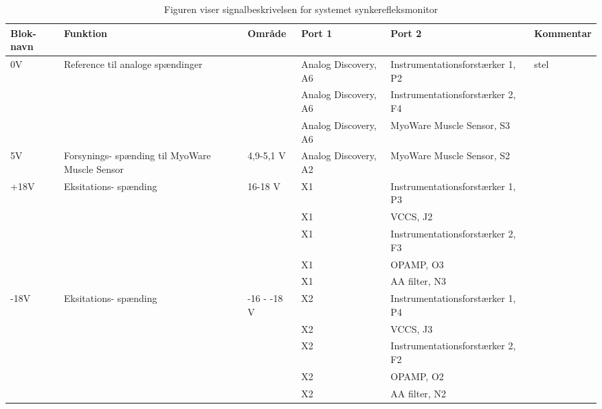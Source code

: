 \begin{table}[H]
\centering
\caption{Figuren viser signalbeskrivelsen for systemet synkerefleksmonitor}
\label{my-label}
\begin{tabular}{|p{1.1cm}|p{2cm}|p{1.4cm}|p{3.5cm}|p{4.4cm}|p{2cm}|}
\hline

\textbf{Blok-navn}  & \textbf{Funktion}                                 & \textbf{Område} & \textbf{Port 1}      & \textbf{Port 2}                  & \textbf{Kommentar} \\ \cline{4-6} \hline


0V & Reference til analoge spændinger  &   & Analog Discovery, A6  & Instrumentationsforstærker 1, P2  &  stel   \\ \cline{4-6}

 &  &   &  Analog Discovery, A6 & Instrumentationsforstærker 2, F4 & \\ \cline{4-6} 
 
 &  &   &  Analog Discovery, A6 & MyoWare Muscle Sensor, S3 & \\ \cline{4-6}

 \hline
5V & Forsynings- spænding til MyoWare Muscle Sensor  &  4,9-5,1 V & Analog Discovery, A2 & MyoWare Muscle Sensor, S2&     \\ \cline{4-6}	\hline




+18V & Eksitations- spænding  &  16-18 V & X1& Instrumentationsforstærker 1, P3 &     \\ \cline{4-6}	

&  &   &  X1 & VCCS, J2 & \\ \cline{4-6} 
&  &   &  X1 & Instrumentationsforstærker 2, F3 & \\ \cline{4-6} 
&  &   &  X1 & OPAMP, O3 & \\ \cline{4-6} 
&  &   &  X1 & AA filter, N3 & \\ \cline{4-6} \hline

	
-18V & Eksitations- spænding  &  -16 - -18 V & X2& Instrumentationsforstærker 1, P4 &     \\ \cline{4-6}

&  &   &  X2 & VCCS, J3 & \\ \cline{4-6} 
&  &   &  X2 & Instrumentationsforstærker 2, F2& \\ \cline{4-6} 
&  &   &  X2 & OPAMP, O2 & \\ \cline{4-6} 
&  &   &  X2 & AA filter, N2 & \\ \cline{4-6}  \hline


\end{tabular}
\end{table}
